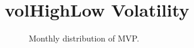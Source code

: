 




\newpage

\section{volHighLow Volatility}
%

\begin{figure}[H]
	\begin{subfigmatrix}{2}
	\end{subfigmatrix}
	\caption{Monthly distribution of MVP.}
	\label{fig:totalRiskMVP}
\end{figure}


